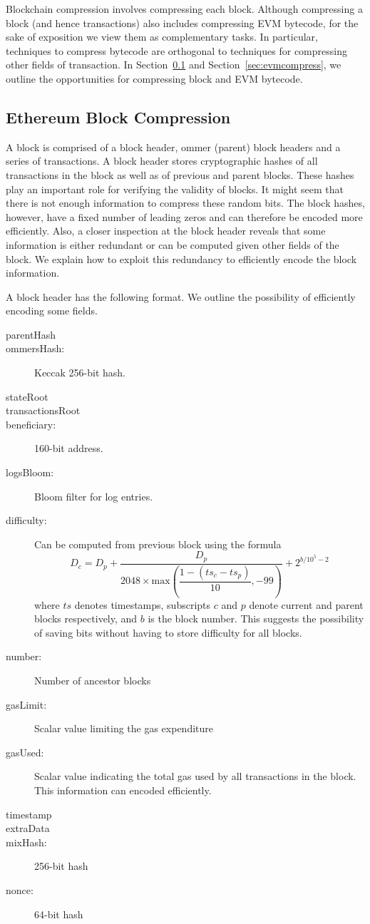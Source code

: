 Blockchain compression involves compressing each block.
Although compressing a block (and hence transactions) also includes compressing EVM bytecode, 
for the sake of exposition we view them as complementary tasks. 
In particular, techniques to compress bytecode are orthogonal to techniques for compressing other fields of transaction.
In Section~\ref{sec:blockcompress} and 
Section~\ref{sec:evmcompress}, we   
outline the opportunities for compressing \eth{} block and EVM bytecode. 

\subsection{Ethereum Block Compression}\label{sec:blockcompress}

A block is comprised of a block header, ommer (parent) block headers and a series of transactions. 
A block header stores cryptographic hashes of all transactions in the block as well as of previous and parent blocks.
These hashes play an important role for verifying the validity of blocks.
It might seem that there is not enough information to compress these random bits. 
The block hashes, however, have a fixed number of leading zeros and
can therefore be encoded more efficiently.
Also, a closer inspection at the block header reveals that 
some information is either redundant or can be computed given other fields of the block.
We explain how to exploit this redundancy to efficiently encode the block information.

A block header has the following format. We outline the possibility of efficiently encoding some fields. 
\begin{description}
 \item[parentHash] 
 \item[ommersHash:]  Keccak 256-bit hash.
 \item[stateRoot]  
 \item[transactionsRoot]
 \item[beneficiary:]160-bit address.
 \item[logsBloom:] Bloom filter for log entries.
 \item[difficulty:] Can be computed from previous block using the formula
 $$
 D_{c} = D_{p} + \dfrac{D_{p}}{2048\times\textrm{max}\left(\dfrac{1 - (ts_{c} - ts_{p})}{10}, -99\right)} + 2^{b/10^5-2}
 $$
 where $ts$ denotes timestamps, subscripts $c$ and $p$ denote current and parent blocks respectively, and $b$ is the block number.
 This suggests the possibility of saving bits without having to store difficulty for all blocks.
 \item[number:] Number of ancestor blocks
 \item[gasLimit:] Scalar value limiting the gas expenditure
 \item[gasUsed:] Scalar value indicating the total gas used by all transactions in the block. This information can encoded efficiently.
 \item[timestamp]
 \item[extraData]
 \item[mixHash:] 256-bit hash
 \item[nonce:] 64-bit hash
\end{description}


